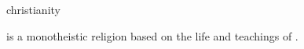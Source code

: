 \documentclass{stex}
\begin{document}
\begin{smodule}{christianity}
\begin{sparagraph}[style=symdoc]
 is a monotheistic religion based on the life and 
teachings of .
\end{sparagraph}
\end{smodule}
\end{document}
